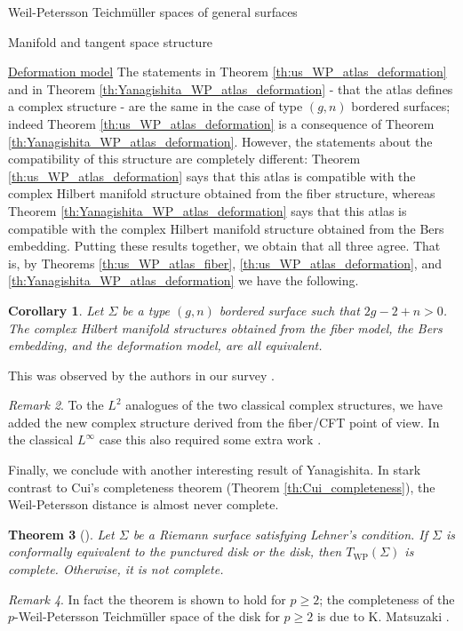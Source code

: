 \documentclass[12pt]{amsart}
\newcommand{\riem}{\Sigma}  %
\theoremstyle{plain}
\newtheorem{theorem}{Theorem}[section]
\newtheorem{corollary}[theorem]{Corollary}
\theoremstyle{definition}
\theoremstyle{remark}
\newtheorem{remark}[theorem]{Remark}
\numberwithin{equation}{section} %
\numberwithin{figure}{section} %
\begin{document}
\begin{section}{Weil-Petersson Teichm\"uller spaces of general surfaces}
\begin{subsection}{Manifold and tangent space structure}
\begin{subsubsection}{{\underline{Deformation model}}}
  The statements in Theorem \ref{th:us_WP_atlas_deformation}  and in Theorem \ref{th:Yanagishita_WP_atlas_deformation} - that the atlas defines a complex structure - are the same in the case of type $(g,n)$ bordered surfaces; indeed Theorem \ref{th:us_WP_atlas_deformation} is a consequence of Theorem \ref{th:Yanagishita_WP_atlas_deformation}. However, the statements about the compatibility of this structure are completely different: Theorem \ref{th:us_WP_atlas_deformation} says that this atlas is compatible with the complex Hilbert manifold structure obtained from the fiber structure, whereas Theorem \ref{th:Yanagishita_WP_atlas_deformation} says that this atlas is compatible with the complex Hilbert manifold structure obtained from the Bers embedding. Putting these results together, we obtain that all three agree. That is, by Theorems \ref{th:us_WP_atlas_fiber},  \ref{th:us_WP_atlas_deformation}, and \ref{th:Yanagishita_WP_atlas_deformation} we have the following.
  \begin{corollary}
   Let $\riem$ be a type $(g,n)$ bordered surface such that $2g-2+n>0$. The complex Hilbert manifold structures obtained from the fiber model, the Bers embedding, and the deformation model, are all equivalent. 
  \end{corollary}
  This was observed by the authors in our survey \cite{SchippersStaubach_comparison}. 
  \begin{remark}
  To the $L^2$ analogues of the two classical complex structures, we have added the new complex structure derived from the fiber/CFT point of view. In the classical $L^\infty$ case this also required some extra work \cite{RadnellSchippers_fiber}. 
  \end{remark}

 Finally, we conclude with another interesting result of Yanagishita. In stark contrast to Cui's completeness theorem (Theorem \ref{th:Cui_completeness}), the Weil-Petersson distance is almost never complete.  
 \begin{theorem}[\cite{Yanagishita_completeness}]
  Let $\riem$ be a Riemann surface satisfying Lehner's condition. If $\riem$ is conformally equivalent to the punctured disk or the disk, then $T_{\mathrm{WP}}(\riem)$ is complete. Otherwise, it is not complete. 
 \end{theorem}
 \begin{remark}
     In fact the theorem is shown to hold for $p\geq 2$; the completeness of the $p$-Weil-Petersson Teichm\"uller space of the disk for $p\geq 2$ is due to K. Matsuzaki \cite{Matsuzaki_rigidity}. 
 \end{remark}
  \end{subsubsection}
 \end{subsection}
\end{section}
\end{document}
